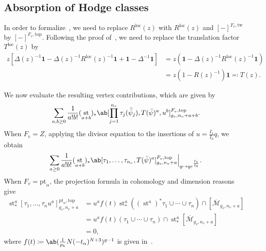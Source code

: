 \documentclass[10pt]{amsart}
\theoremstyle{definition}
\theoremstyle{remark}
\theoremstyle{plain}
\theoremstyle{definition}
\theoremstyle{remark}
\newcommand{\msc}[1]{\mathscr{#1}}
\newcommand{\mr}[1]{\mathrm{#1}}
\newcommand{\ol}[1]{\overline{#1}}
\newcommand{\1}{\mathbf{1}}
\newcommand{\2}{\mathbf{2}}
\newcommand{\3}{\mathbf{3}}
\newcommand{\pt}{\mr{pt}}
\newcommand{\loc}{\mr{loc}}
\newcommand{\tw}{\mr{tw}}
\renewcommand{\top}{\mr{top}}
\DeclareMathOperator{\st}{st}
\numberwithin{equation}{section}
\begin{document}
\subsection{Absorption of Hodge classes}%
\label{sub:Absorption of Hodge classes}

In order to formalize~, we need to replace $R^{\loc}(z)$ with $R^{\loc}(z)$ and $[-]^{F_v, \tw}$ by $[-]^{F_v, \top}$. Following the proof of~\cite[Proposition 2.14]{relationsvia3spin}, we need to replace the translation factor $T^{\loc}(z)$ by
\begin{align*}
    z[\Delta(z)^{-1} \1 - \Delta(z)^{-1}R^{\loc}(z)^{-1}\1 + \1 - \Delta^{-1}\1] &= z (\1 - \Delta(z)^{-1}R^{\loc}(z)^{-1}\1) \\
    &= z(1-R(z)^{-1})\1 \eqqcolon T(z).
\end{align*}

We now evaluate the resulting vertex contributions, which are given by
\[ \sum_{a,b \geq 0} \frac{1}{a!b!} (\st_{a+b})_*\ab[\prod_{j=1}^{n_v} \tau_j(\bar{\bar{\psi}}_j),  T(\bar{\psi})^a, u^b]_{g_v, n_v+a+b}^{F_v, \top}. \]
When $F_v = Z$, applying the divisor equation to the insertions of $u = \frac{I_1}{I_0}q$, we obtain
\[ \sum_{a \geq 0} \frac{1}{a!b!} (\st_{a+b})_*\ab[\tau_1, \ldots, \tau_{n_v},  T(\bar{\psi})^a]_{g_v, n_v+a}^{F_v, \top}\Big\vert_{q \mapsto q e^{\frac{I_1}{I_0}}}. \]
When $F_v = \pt_{\alpha}$, the projection formula in cohomology and dimension reasons give
\begin{align*}
    \st^a_* [\tau_1, \ldots, \tau_n u^a]_{g_v, n_v+a}^{\pt_{\alpha}, \top} &= u^a f(t) \st^a_* ((\st^a)^* \tau_1 \cup \cdots \cup \tau_n) \cap [\ol{\msc{M}}_{g_v, n_v+a}] \\
    &= u^a f(t) (\tau_1 \cup \cdots \cup \tau_n) \cap \st^a_* [\ol{\msc{M}}_{g_v, n_v+a}] \\
    &= 0,
\end{align*}
where $f(t) \coloneqq \ab(\frac{1}{p_k}N(-t_{\alpha})^{N+3})^{g-1}$ is given in~.
\end{document}
